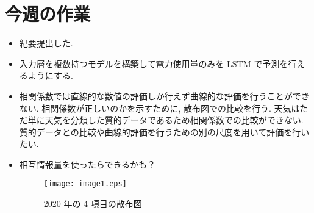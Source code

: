 \section{今週の作業}
\begin{itemize}
        \item 紀要提出した. 
        \item 入力層を複数持つモデルを構築して電力使用量のみを LSTM で予測を行えるようにする.
        \item 相関係数では直線的な数値の評価しか行えず曲線的な評価を行うことができない. 相関係数が正しいのかを示すために, 散布図での比較を行う.
        天気はただ単に天気を分類した質的データであるため相関係数での比較ができない. 質的データとの比較や曲線的評価を行うための別の尺度を用いて評価を行いたい. 
        \item 相互情報量を使ったらできるかも？

\begin{figure}[!hb]
  \begin{center}
    \texttt{[image: image1.eps]}
    \caption{2020 年の 4 項目の散布図}
  \end{center}
\end{figure}
\end{itemize}

